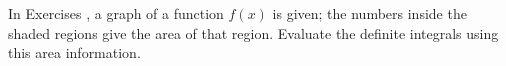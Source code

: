 {\noindent In Exercises}
{, a graph of a function $f(x)$ is given; the numbers inside the shaded regions give the area of that region. Evaluate the definite integrals using this area information.}
